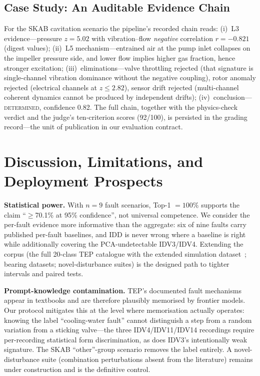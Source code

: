 \documentclass[journal]{IEEEtran}
\begin{document}
\subsection{Case Study: An Auditable Evidence Chain}
For the SKAB cavitation scenario the pipeline's recorded chain reads: (i)~L3 evidence---pressure $z{=}5.02$ with vibration--flow \emph{negative} correlation $r{=}{-}0.821$ (digest values); (ii)~L5 mechanism---entrained air at the pump inlet collapses on the impeller pressure side, and lower flow implies higher gas fraction, hence stronger excitation; (iii)~eliminations---valve throttling rejected (that signature is single-channel vibration dominance without the negative coupling), rotor anomaly rejected (electrical channels at $z{\le}2.82$), sensor drift rejected (multi-channel coherent dynamics cannot be produced by independent drifts); (iv)~conclusion---\textsc{determined}, confidence 0.82. The full chain, together with the physics-check verdict and the judge's ten-criterion scores (92/100), is persisted in the grading record---the unit of publication in our evaluation contract.

\section{Discussion, Limitations, and Deployment Prospects}
\label{sec:discussion}

\textbf{Statistical power.} With $n{=}9$ fault scenarios, Top-1 $=100\%$ supports the claim ``$\ge$70.1\% at 95\% confidence'', not universal competence. We consider the per-fault evidence more informative than the aggregate: six of nine faults carry published per-fault baselines, and IDD is never wrong where a baseline is right while additionally covering the PCA-undetectable IDV3/IDV4. Extending the corpus (the full 20-class TEP catalogue with the extended simulation dataset~\cite{reinartz2021extended}; bearing datasets; novel-disturbance suites) is the designed path to tighter intervals and paired tests.

\textbf{Prompt-knowledge contamination.} TEP's documented fault mechanisms appear in textbooks and are therefore plausibly memorised by frontier models. Our protocol mitigates this at the level where memorisation actually operates: knowing the label ``cooling-water fault'' cannot distinguish a step from a random variation from a sticking valve---the three IDV4/IDV11/IDV14 recordings require per-recording statistical form discrimination, as does IDV3's intentionally weak signature. The SKAB ``other''-group scenario removes the label entirely. A novel-disturbance suite (combination perturbations absent from the literature) remains under construction and is the definitive control.
\end{document}
